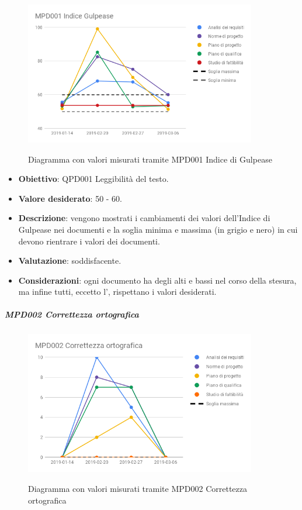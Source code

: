	\begin{figure}[H]
		\centering
		\includegraphics[width=0.9\textwidth]{img/cruscotti/MPD001.png}
		\label{immaginegulpease}
		\caption{Diagramma con valori misurati tramite MPD001 Indice di Gulpease}
	\end{figure}

	\begin{itemize}
		\item \textbf{Obiettivo}: QPD001 Leggibilità del testo.
		\item \textbf{Valore desiderato}: 50 - 60.
		\item \textbf{Descrizione}: vengono mostrati i cambiamenti dei valori dell'Indice di Gulpease nei documenti e la soglia minima e massima (in grigio e nero) in cui devono rientrare i valori dei documenti. 
		\item \textbf{Valutazione}: soddisfacente.
		\item \textbf{Considerazioni}: ogni documento ha degli alti e bassi nel corso della stesura, ma infine tutti, eccetto l'\AdR, rispettano i valori desiderati.
	\end{itemize}


	\subparagraph{MPD002 Correttezza ortografica}

	\begin{figure}[H]
		\centering
		\includegraphics[width=0.9\textwidth]{img/cruscotti/MPD002.png}
		\label{immagineCorrettezzaOrtografica}
		\caption{Diagramma con valori misurati tramite MPD002 Correttezza ortografica}
	\end{figure}

